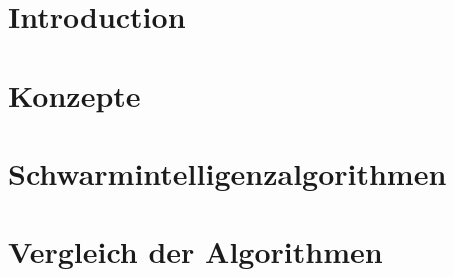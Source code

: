 \documentclass[12pt, a4paper]{report}
\begin{document}

\chapter{Introduction}

\chapter{Konzepte}

\chapter{Schwarmintelligenzalgorithmen}

\chapter{Vergleich der Algorithmen}

\printbibliography
\end{document}
